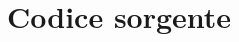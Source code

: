 \def\baselinestretch{1}
\section{Codice sorgente}
\def\baselinestretch{1.66}
\thispagestyle{headings}